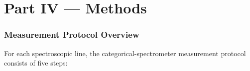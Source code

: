 \documentclass[11pt,a4paper]{article}
\theoremstyle{stmtstyle}
\theoremstyle{definition}
\theoremstyle{remark}
\begin{document}
\clearpage

\part*{Part IV --- Methods}

\section{Measurement Protocol Overview}
\label{sec:methods_protocol}

For each spectroscopic line, the categorical-spectrometer measurement protocol consists of five steps:
\end{document}
